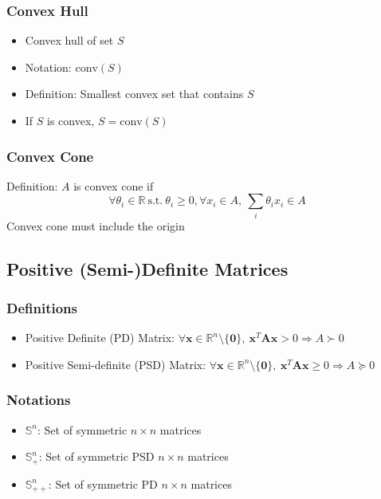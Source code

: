 \subsubsection*{Convex Hull}
\begin{itemize}
    \item Convex hull of set $S$
    \item Notation: $\mathrm{conv}(S)$
    \item Definition: Smallest convex set that contains $S$
    \item If $S$ is convex, $S = \mathrm{conv}(S)$
\end{itemize}

\subsubsection*{Convex Cone}
Definition: $A$ is convex cone if
$$
    \forall \theta_i \in \mathbb{R}~\mathrm{s.t.}~\theta_i \geq 0, \forall x_i \in A,~\sum_i \theta_i x_i \in A
$$
Convex cone must include the origin

\subsection{Positive (Semi-)Definite Matrices}

\subsubsection*{Definitions}
\begin{itemize}
    \item Positive Definite (PD) Matrix: 
        $ \forall \mathbf{x} \in \mathbb{R}^n \setminus \{\mathbf{0}\},~ \mathbf{x}^T\mathbf{A}\mathbf{x} > 0 \Rightarrow A \succ 0$
    \item Positive Semi-definite (PSD) Matrix: 
        $ \forall \mathbf{x} \in \mathbb{R}^n \setminus \{\mathbf{0}\},~ \mathbf{x}^T\mathbf{A}\mathbf{x} \geq 0 \Rightarrow A \succeq 0$
\end{itemize}

\subsubsection*{Notations}
\begin{itemize}
    \item $\mathbb{S}^n$: Set of symmetric $n \times n$ matrices
    \item $\mathbb{S}^n_+$: Set of symmetric PSD $n \times n$ matrices
    \item $\mathbb{S}^n_{++}$: Set of symmetric PD $n \times n$ matrices
\end{itemize}

